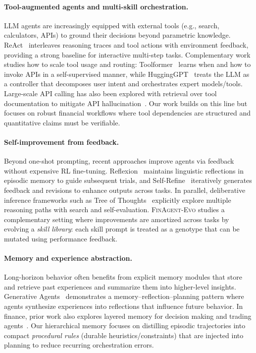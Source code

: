 \documentclass{article}
\begin{document}
\paragraph{Tool-augmented agents and multi-skill orchestration.}
LLM agents are increasingly equipped with external tools (e.g., search, calculators, APIs) to ground their decisions beyond parametric knowledge. ReAct~\citep{yao2023react} interleaves reasoning traces and tool actions with environment feedback, providing a strong baseline for interactive multi-step tasks. Complementary work studies how to scale tool usage and routing: Toolformer~\citep{schick2023toolformer} learns when and how to invoke APIs in a self-supervised manner, while HuggingGPT~\citep{shen2023hugginggpt} treats the LLM as a controller that decomposes user intent and orchestrates expert models/tools. Large-scale API calling has also been explored with retrieval over tool documentation to mitigate API hallucination~\citep{patil2024gorilla}. Our work builds on this line but focuses on robust financial workflows where tool dependencies are structured and quantitative claims must be verifiable.

\paragraph{Self-improvement from feedback.}
Beyond one-shot prompting, recent approaches improve agents via feedback without expensive RL fine-tuning. Reflexion~\citep{shinn2023reflexion} maintains linguistic reflections in episodic memory to guide subsequent trials, and Self-Refine~\citep{madaan2023selfrefine} iteratively generates feedback and revisions to enhance outputs across tasks. In parallel, deliberative inference frameworks such as Tree of Thoughts~\citep{yao2023tree} explicitly explore multiple reasoning paths with search and self-evaluation. \textsc{FinAgent-Evo} studies a complementary setting where improvements are amortized across tasks by evolving a \emph{skill library}: each skill prompt is treated as a genotype that can be mutated using performance feedback.

\paragraph{Memory and experience abstraction.}
Long-horizon behavior often benefits from explicit memory modules that store and retrieve past experiences and summarize them into higher-level insights. Generative Agents~\citep{park2023generativeagents} demonstrates a memory--reflection--planning pattern where agents synthesize experiences into reflections that influence future behavior. In finance, prior work also explores layered memory for decision making and trading agents~\citep{finmem2023}. Our hierarchical memory focuses on distilling episodic trajectories into compact \emph{procedural rules} (durable heuristics/constraints) that are injected into planning to reduce recurring orchestration errors.
\end{document}

